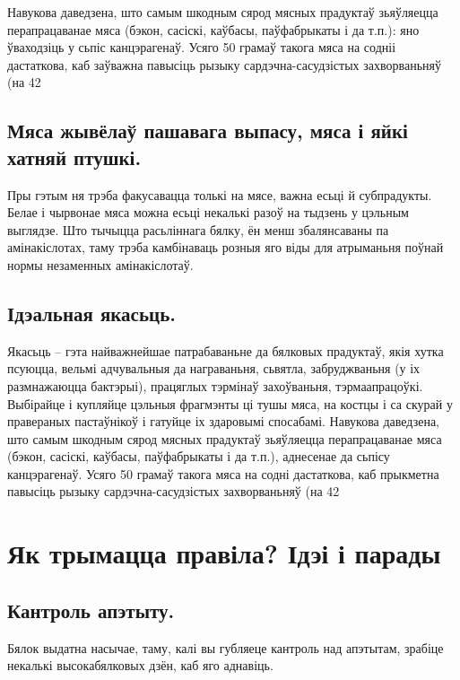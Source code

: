 Навукова даведзена, што самым шкодным сярод мясных прадуктаў зьяўляецца перапрацаванае мяса (бэкон, сасіскі, каўбасы, паўфабрыкаты і да т.п.): яно ўваходзіць у сьпіс канцэрагенаў. Усяго 50 грамаў такога мяса на содніі дастаткова, каб заўважна павысіць рызыку сардэчна-сасудзістых захворваньняў (на 42%

\subsection{Мяса жывёлаў пашавага выпасу, мяса і яйкі хатняй птушкі.}
Пры гэтым ня трэба факусавацца толькі на мясе, важна есьці й субпрадукты. Белае і чырвонае мяса можна есьці некалькі разоў на тыдзень у цэльным выглядзе. Што тычыцца расьліннага бялку, ён менш збалянсаваны па амінакіслотах, таму трэба камбінаваць розныя яго віды для атрыманьня поўнай нормы незаменных амінакіслотаў.

\subsection{Ідэальная якасьць.}
Якасьць – гэта найважнейшае патрабаваньне да бялковых прадуктаў, якія хутка псуюцца, вельмі адчувальныя да награваньня, сьвятла, забруджваньня (у іх размнажаюцца бактэрыі), працяглых тэрмінаў захоўваньня, тэрмаапрацоўкі. Выбірайце і купляйце цэльныя фрагмэнты ці тушы мяса, на костцы і са скурай у правераных пастаўнікоў і гатуйце іх здаровымі спосабамі. Навукова даведзена, што самым шкодным сярод мясных прадуктаў зьяўляецца перапрацаванае мяса (бэкон, сасіскі, каўбасы, паўфабрыкаты і да т.п.), аднесенае да сьпісу канцэрагенаў. Усяго 50 грамаў такога мяса на содні дастаткова, каб прыкметна павысіць рызыку сардэчна-сасудзістых захворваньняў (на 42%

\section{Як трымацца правіла? Ідэі і парады}

\subsection{Кантроль апэтыту.}
Бялок выдатна насычае, таму, калі вы губляеце кантроль над апэтытам, зрабіце некалькі высокабялковых дзён, каб яго аднавіць.

